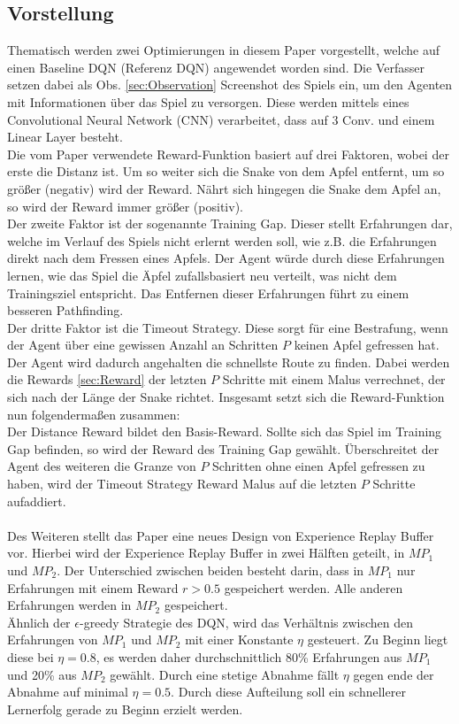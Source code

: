 \subsection{Vorstellung}
Thematisch werden zwei Optimierungen in diesem Paper vorgestellt, welche auf einen Baseline DQN (Referenz DQN) angewendet worden sind.
Die Verfasser setzen dabei als Obs. \ref{sec:Observation} Screenshot des Spiels ein, um den Agenten mit Informationen über das Spiel zu versorgen. Diese werden mittels eines Convolutional Neural Network (CNN) verarbeitet, dass auf 3 Conv. und einem Linear Layer besteht.\\
Die vom Paper verwendete Reward-Funktion basiert auf drei Faktoren, wobei der erste die Distanz ist. Um so weiter sich die Snake von dem Apfel entfernt, um so größer (negativ) wird der Reward. Nährt sich hingegen die Snake dem Apfel an, so wird der Reward immer größer (positiv).\\
Der zweite Faktor ist der sogenannte Training Gap. Dieser stellt Erfahrungen dar, welche im Verlauf des Spiels nicht erlernt werden soll, wie z.B. die Erfahrungen direkt nach dem Fressen eines Apfels. Der Agent würde durch diese Erfahrungen lernen, wie das Spiel die Äpfel zufallsbasiert neu verteilt, was nicht dem Trainingsziel entspricht. Das Entfernen dieser Erfahrungen führt zu einem besseren Pathfinding.\\
Der dritte Faktor ist die Timeout Strategy. Diese sorgt für eine Bestrafung, wenn der Agent über eine gewissen Anzahl an Schritten $P$ keinen Apfel gefressen hat. Der Agent wird dadurch angehalten die schnellste Route zu finden. Dabei werden die Rewards \ref{sec:Reward} der letzten $P$ Schritte mit einem Malus verrechnet, der sich nach der Länge der Snake richtet.
Insgesamt setzt sich die Reward-Funktion nun folgendermaßen zusammen:\\
Der Distance Reward bildet den Basis-Reward. Sollte sich das Spiel im Training Gap befinden, so wird der Reward des Training Gap gewählt. Überschreitet der Agent des weiteren die Granze von $P$ Schritten ohne einen Apfel gefressen zu haben, wird der Timeout Strategy Reward Malus auf die letzten $P$ Schritte aufaddiert.\\
\\Des Weiteren stellt das Paper eine neues Design von Experience Replay Buffer vor. Hierbei wird der Experience Replay Buffer in zwei Hälften geteilt, in $MP_{1}$ und $MP_{2}$. Der Unterschied zwischen beiden besteht darin, dass in $MP_{1}$ nur Erfahrungen mit einem Reward $r > 0.5$ gespeichert werden. Alle anderen Erfahrungen werden in $MP_{2}$ gespeichert.\\
Ähnlich der $\epsilon$-greedy Strategie des DQN, wird das Verhältnis zwischen den Erfahrungen von $MP_{1}$ und $MP_{2}$ mit einer Konstante $\eta$ gesteuert. Zu Beginn liegt diese bei $\eta = 0.8$, es werden daher durchschnittlich 80\% Erfahrungen aus $MP_{1}$ und 20\% aus $MP_{2}$ gewählt. Durch eine stetige Abnahme fällt $\eta$ gegen ende der Abnahme auf minimal $\eta = 0.5$.
Durch diese Aufteilung soll ein schnellerer Lernerfolg gerade zu Beginn erzielt werden.

